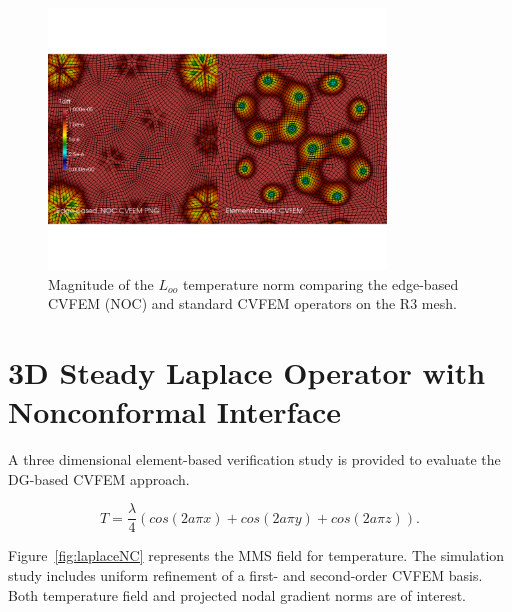 \begin{figure}
\centerline{\includegraphics[width=0.8\textwidth]{figures/tquadEdgeCvfemTdiff.pdf}}
\caption{Magnitude of the $L_{oo}$ temperature norm comparing the edge-based CVFEM (NOC) and standard CVFEM operators on the R3 mesh.}
\label{fig:tquadTdiff}
\end{figure}

\section{3D Steady Laplace Operator with Nonconformal Interface}
A three dimensional element-based verification study is provided to evaluate the DG-based CVFEM approach.

\begin{equation}
  T = \frac{\lambda}{4} (cos(2 a \pi x) + cos(2 a \pi y) + cos(2 a \pi z)).
\label{3dT}
\end{equation}

Figure~\ref{fig:laplaceNC} represents the MMS field for temperature. The simulation study includes uniform 
refinement of a first- and second-order CVFEM basis. Both temperature field and projected nodal gradient
norms are of interest.

